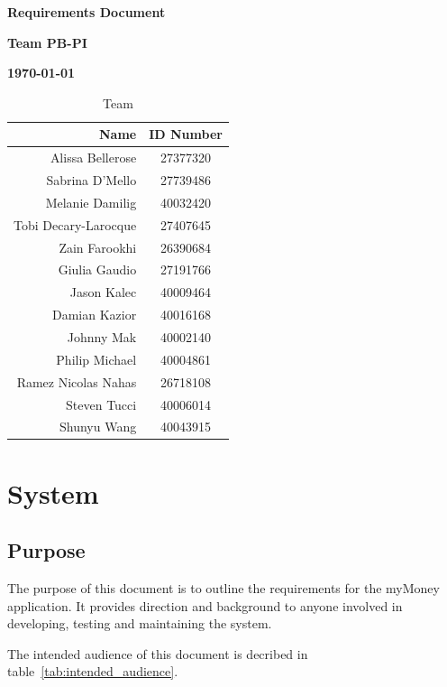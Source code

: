 \documentclass[12pt]{article}
\begin{document}
\vspace*{0.5in}
\centerline{\bf\Large Requirements Document}

\vspace*{0.5in}
\centerline{\bf\Large Team PB-PI}

\vspace*{0.5in}
\centerline{\bf\Large \today}

\vspace*{1.5in}
\begin{table}[htbp]
\caption{Team}
\begin{center}
\begin{tabular}{|r | c|}
\hline
Name & ID Number \\
\hline\hline
Alissa Bellerose & 27377320 \\
Sabrina D'Mello & 27739486 \\
Melanie Damilig & 40032420 \\
Tobi Decary-Larocque & 27407645 \\
Zain Farookhi & 26390684 \\
Giulia Gaudio & 27191766 \\
Jason Kalec & 40009464 \\
Damian Kazior & 40016168 \\
Johnny Mak & 40002140 \\
Philip Michael & 40004861 \\
Ramez Nicolas Nahas & 26718108 \\
Steven Tucci & 40006014 \\
Shunyu Wang & 40043915 \\
\hline
\end{tabular}
\end{center}
\end{table}

\clearpage

\section{System}

\subsection{Purpose}
The purpose of this document is to outline the requirements for the myMoney application. It provides direction and background to anyone involved in developing, testing and maintaining the system.

The intended audience of this document is decribed in table~\ref{tab:intended_audience}.
\end{document}
